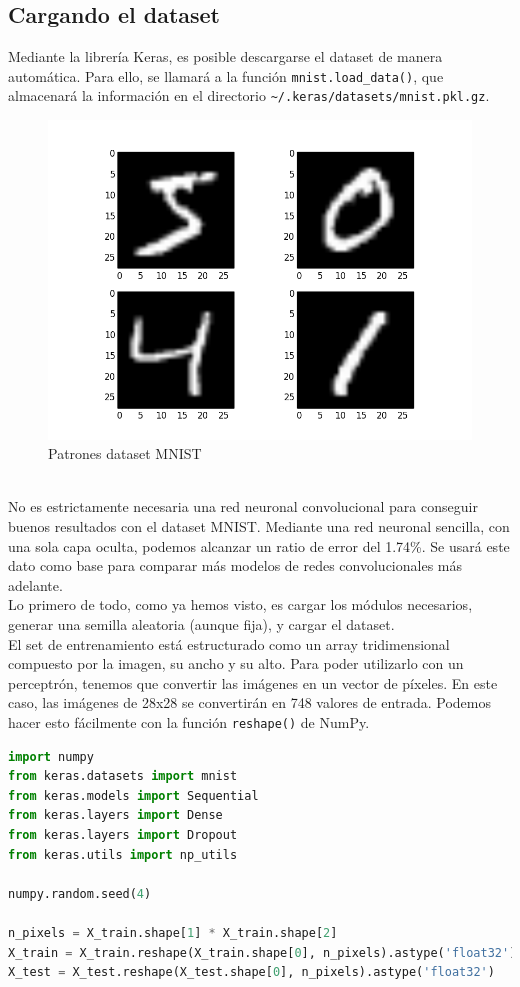 \subsection{Cargando el dataset}
Mediante la librería Keras, es posible descargarse el dataset de manera automática. Para ello, se llamará a la función \lstinline{mnist.load_data()}, que almacenará la información en el directorio \lstinline{~/.keras/datasets/mnist.pkl.gz}.
\mbox{}
\begin{figure}[htp]
\centering
\includegraphics[scale=0.20]{images/mnist.png}
\caption{Patrones dataset MNIST}
\end{figure}
\\No es estrictamente necesaria una red neuronal convolucional para conseguir buenos resultados con el dataset MNIST. Mediante una red neuronal sencilla, con una sola capa oculta, podemos alcanzar un ratio de error del 1.74\%. Se usará este dato como base para comparar más modelos de redes convolucionales más adelante.\\
Lo primero de todo, como ya hemos visto, es cargar los módulos necesarios, generar una semilla aleatoria (aunque fija), y cargar el dataset.\\
El set de entrenamiento está estructurado como un array tridimensional compuesto por la imagen, su ancho y su alto. Para poder utilizarlo con un perceptrón, tenemos que convertir las imágenes en un vector de píxeles. En este caso, las imágenes de 28x28 se convertirán en 748 valores de entrada. Podemos hacer esto fácilmente  con la función \lstinline{reshape()} de NumPy.
\begin{lstlisting}[language=Python]
import numpy
from keras.datasets import mnist
from keras.models import Sequential
from keras.layers import Dense
from keras.layers import Dropout
from keras.utils import np_utils

numpy.random.seed(4)

n_pixels = X_train.shape[1] * X_train.shape[2]
X_train = X_train.reshape(X_train.shape[0], n_pixels).astype('float32')
X_test = X_test.reshape(X_test.shape[0], n_pixels).astype('float32')
\end{lstlisting}

